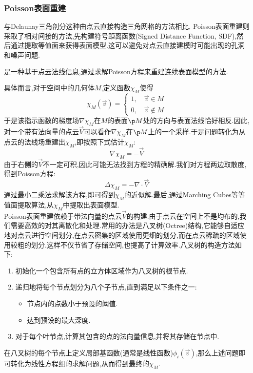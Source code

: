 \documentclass{ctexart}
\begin{document}
\subsubsection{Poisson表面重建}
与Delaunay三角剖分这种由点云直接构造三角网格的方法相比, Poisson表面重建则采取了相对间接的方法,先构建符号距离函数(Signed Distance Function, SDF),然后通过提取等值面来获得表面模型.这可以避免对点云直接建模时可能出现的孔洞和噪声问题.
\begin{definition}[Poisson表面重建]
    是一种基于点云法线信息,通过求解Poisson方程来重建连续表面模型的方法.
\end{definition}
具体而言,对于空间中的几何体$M$,定义函数$\chi_M$使得
\[\chi_M(\vec{v})=\left\{\begin{array}{l}
    1,\quad \vec{v}\in M\\
    0,\quad \vec{v}\notin M
\end{array}\right.\]
于是该指示函数的梯度场$\nabla\chi_M$在$M$的表面$\p M$处的方向与表面法线恰好相反.因此,对一个带有法向量的点云$\vec{V}$可以看作$\nabla\chi_M$在$\p M$上的一个采样.于是问题转化为从点云的法线场重建出$\chi_M$,即按照下式估计$\chi_M$:
\[\nabla\chi_M=-\vec{V}\]
由于右侧的$\vec{V}$不一定可积,因此可能无法找到方程的精确解.我们对方程两边取散度,得到Poisson方程:
\[\Delta\chi_M=-\nabla\cdot\vec{V}\]
通过最小二乘法求解该方程,即可得到$\chi_M$的近似解.最后,通过Marching Cubes等等值面提取算法,从$\chi_M$中提取出表面模型.\\
\indent Poisson表面重建依赖于带法向量的点云$\vec{V}$的构建.由于点云在空间上不是均布的,我们需要高效的对其离散化和处理.常用的办法是八叉树(Octree)结构,它能够自适应地对点云进行空间划分,在点云密集的区域使用更细的划分,而在点云稀疏的区域使用较粗的划分.这样不仅节省了存储空间,也提高了计算效率.八叉树的构造方法如下:
\begin{enumerate}[label=\tbf{\arabic*.},topsep=0pt,parsep=0pt,itemsep=0pt,partopsep=0pt]
    \item 初始化一个包含所有点的立方体区域作为八叉树的根节点.
    \item 递归地将每个节点划分为八个子节点,直到满足以下条件之一:
    \begin{itemize}[topsep=0pt,parsep=0pt,itemsep=0pt,partopsep=0pt]
        \item 节点内的点数小于预设的阈值.
        \item 达到预设的最大深度.
    \end{itemize}
    \item 对于每个叶节点,计算其包含的点的法向量信息,并将其存储在节点中.
\end{enumerate}
在八叉树的每个节点上定义局部基函数(通常是线性函数)$\phi_i(\vec{v})$,那么上述问题即可转化为线性方程组的求解问题,从而得到最终的$\chi_M$.
\end{document}
